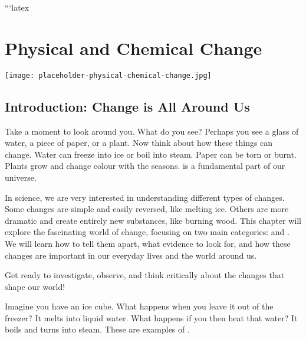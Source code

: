 ```latex
\chapter{Physical and Chemical Change}

\begin{marginfigure}
\texttt{[image: placeholder-physical-chemical-change.jpg]}
\end{marginfigure}

\section*{Introduction: Change is All Around Us}

Take a moment to look around you. What do you see?  Perhaps you see a glass of water, a piece of paper, or a plant. Now think about how these things can change. Water can freeze into ice or boil into steam. Paper can be torn or burnt. Plants grow and change colour with the seasons.   is a fundamental part of our universe.

In science, we are very interested in understanding different types of changes. Some changes are simple and easily reversed, like melting ice. Others are more dramatic and create entirely new substances, like burning wood. This chapter will explore the fascinating world of change, focusing on two main categories:  and . We will learn how to tell them apart, what evidence to look for, and how these changes are important in our everyday lives and the world around us.

\begin{marginnote}
\end{marginnote}

Get ready to investigate, observe, and think critically about the changes that shape our world!

\FloatBarrier

Imagine you have an ice cube. What happens when you leave it out of the freezer? It melts into liquid water. What happens if you then heat that water? It boils and turns into steam. These are examples of .

